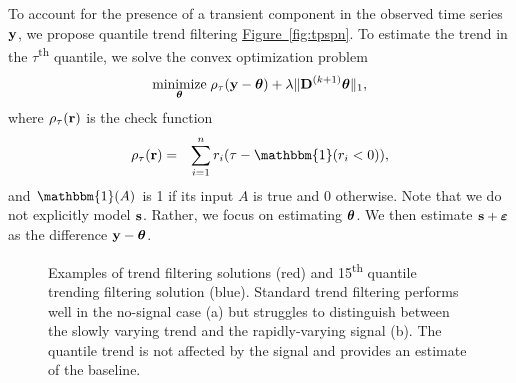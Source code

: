 \documentclass[aoas]{imsart}
\newcommand{\Fig}[1]{\hyperref[fig:#1]{Figure~\ref*{fig:#1}}} %
\newcommand{\Fig}[1]{{Figure~\ref{fig:#1}}} %
\newcommand{\One}{\mathbbm{1}}
\newcommand{\V}[1]{{\bm{\mathbf{\MakeLowercase{#1}}}}} %
\newcommand{\VE}[2]{\MakeLowercase{#1}_{#2}} %
\newcommand{\M}[1]{{\bm{\mathbf{\MakeUppercase{#1}}}}} %
\newcommand{\Mn}[2]{\M{#1}^{(#2)}} %
\begin{document}
To account for the presence of a transient component in the observed time series $\V{y}$, we propose quantile trend filtering \Fig{tpspn}. %
To estimate the trend in the $\tau$\textsuperscript{th} quantile, we solve the convex optimization problem
\begin{eqnarray}
\label{eq:quantile_trend}
\underset{\V{\theta}}{\text{minimize}}\; \rho_\tau(\V{y} - \V{\theta}) + \lambda \lVert \Mn{D}{k+1} \V{\theta} \rVert_1,
\end{eqnarray}
where $\rho_\tau(\V{r})$ is the check function
\begin{eqnarray}
\label{eq:check}
\rho_{\tau}(\V{r}) & = & \sum_{i=1}^n \VE{r}{i}(\tau-\One(\VE{r}{i}<0)),
\end{eqnarray}
and $\One(A)$ is 1 if its input $A$ is true and 0 otherwise. Note that we do not explicitly model $\V{s}$. Rather, we focus on estimating $\V{\theta}$. We then estimate $\V{s} + \V{\varepsilon}$ as the difference $\V{y} - \V{\theta}$.

\begin{figure}
	\centering
	\caption{Examples of trend filtering solutions (red) and 15\textsuperscript{th} quantile trending filtering solution (blue). Standard trend filtering performs well in the no-signal case (a) but struggles to distinguish between the slowly varying trend and the rapidly-varying signal (b). The quantile trend is not affected by the signal and provides an estimate of the baseline.}
\end{figure}
\end{document}
